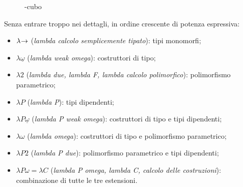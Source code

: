 \begin{figure}
    \vspace{4mm}
    \caption{\textlambda-cubo}
    \label{fig:3-lambda-cube}
    \vspace{4mm}
\end{figure}

\noindent Senza entrare troppo nei dettagli, in ordine crescente di potenza espressiva:

\begin{itemize}
    \item $\lambda\mkern-4mu\rightarrow$ (\textit{lambda calcolo semplicemente tipato}): tipi monomorfi;
    \item $\lambda\underline{\omega}$ (\textit{lambda weak omega}): costruttori di tipo;
    \item $\lambda2$ (\textit{lambda due, lambda F, lambda calcolo polimorfico}): polimorfismo parametrico;
    \item $\lambda P$ (\textit{lambda P}): tipi dipendenti;
    \item $\lambda P\underline{\omega}$ (\textit{lambda P weak omega}): costruttori di tipo e tipi dipendenti;
    \item $\lambda\omega$ (\textit{lambda omega}): costruttori di tipo e polimorfismo parametrico;
    \item $\lambda P2$ (\textit{lambda P due}): polimorfismo parametrico e tipi dipendenti;
    \item $\lambda P\omega\!=\!\lambda C$ (\textit{lambda P omega, lambda C, calcolo delle costruzioni}): combinazione di tutte le tre estensioni.
\end{itemize}